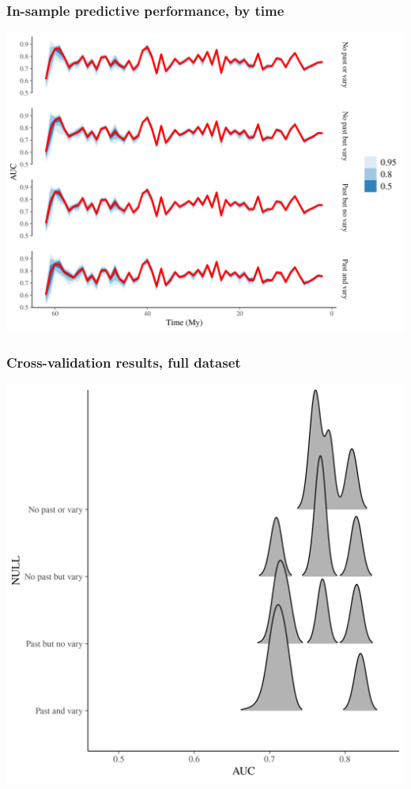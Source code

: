 \documentclass{beamer}
\begin{document}
\begin{frame}
  \frametitle{In-sample predictive performance, by time}

  \includegraphics[width=\textwidth,height=0.8\textheight,keepaspectratio=true]{../results/figure/auc_ts}

\end{frame}


\begin{frame}
  \frametitle{Cross-validation results, full dataset}

  \includegraphics[width=\textwidth,height=0.8\textheight,keepaspectratio=true]{../results/figure/fold_auc}

\end{frame}
\end{document}
